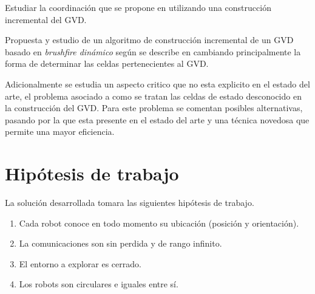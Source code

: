 Estudiar la coordinación que se propone en \cite{wurm2008coordinated} utilizando una construcción incremental del GVD.

Propuesta y estudio de un algoritmo de construcción incremental de un GVD basado en \emph{brushfire dinámico} según se describe en \cite{Lau2013} cambiando principalmente la forma de determinar las celdas pertenecientes al GVD.

Adicionalmente se estudia un aspecto critico que no esta explicito en el estado del arte, el problema asociado a como se tratan las celdas de estado desconocido en la construcción del GVD. Para este problema se comentan posibles alternativas, pasando por la que esta presente en el estado del arte y una técnica novedosa que permite una mayor eficiencia.


\section{Hipótesis de trabajo}
La solución desarrollada tomara las siguientes hipótesis de trabajo.
\begin{enumerate}[label=(\roman*)]
  \item Cada robot conoce en todo momento su ubicación (posición y orientación).
  \item La comunicaciones son sin perdida y de rango infinito.
  \item El entorno a explorar es cerrado.
  \item Los robots son circulares e iguales entre sí.
\end{enumerate}

